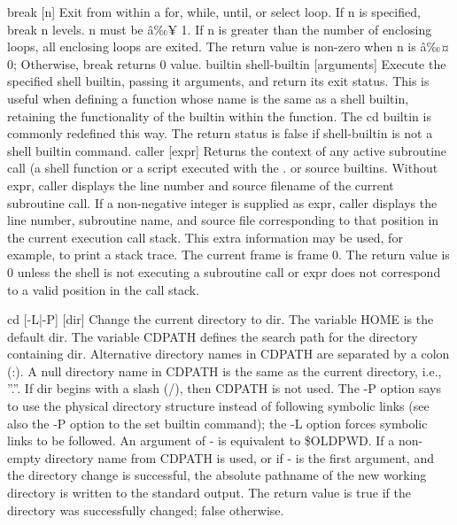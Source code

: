 \begin{longtable}
break [n]
Exit from within a for, while, until, or select loop. If n is specified, break n levels. n must be â‰¥ 1. If n is greater than the number of enclosing loops, all enclosing loops are exited. The return value is non-zero when n is â‰¤ 0; Otherwise, break returns 0 value.
builtin shell-builtin [arguments]
Execute the specified shell builtin, passing it arguments, and return its exit status. This is useful when defining a function whose name is the same as a shell builtin, retaining the functionality of the builtin within the function. The cd builtin is commonly redefined this way. The return status is false if shell-builtin is not a shell builtin command.
caller [expr]
Returns the context of any active subroutine call (a shell function or a script executed with the . or source builtins. Without expr, caller displays the line number and source filename of the current subroutine call. If a non-negative integer is supplied as expr, caller displays the line number, subroutine name, and source file corresponding to that position in the current execution call stack. This extra information may be used, for example, to print a stack trace. The current frame is frame 0. The return value is 0 unless the shell is not executing a subroutine call or expr does not correspond to a valid position in the call stack.

cd [-L|-P] [dir]
Change the current directory to dir. The variable HOME is the default dir. The variable CDPATH defines the search path for the directory containing dir. Alternative directory names in CDPATH are separated by a colon (:). A null directory name in CDPATH is the same as the current directory, i.e., ''.''. If dir begins with a slash (/), then CDPATH is not used. The -P option says to use the physical directory structure instead of following symbolic links (see also the -P option to the set builtin command); the -L option forces symbolic links to be followed. An argument of - is equivalent to \$OLDPWD. If a non-empty directory name from CDPATH is used, or if - is the first argument, and the directory change is successful, the absolute pathname of the new working directory is written to the standard output. The return value is true if the directory was successfully changed; false otherwise.


\end{longtable}
